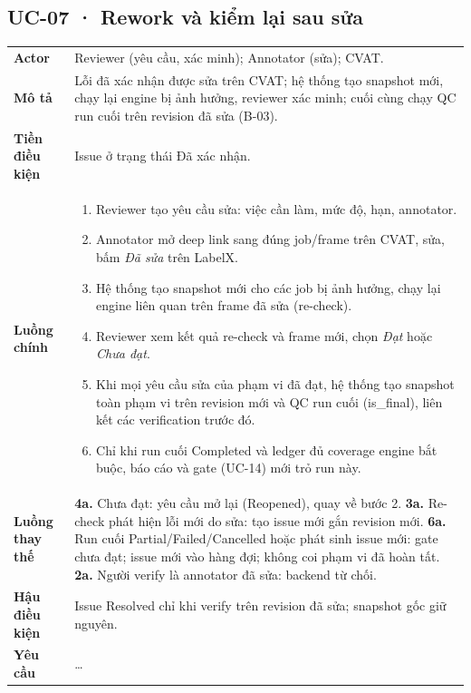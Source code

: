 \subsection*{UC-07 · Rework và kiểm lại sau sửa}
\begin{xltabular}{\linewidth}{@{}>{\bfseries}L{3.2cm}Y@{}}
\toprule
Actor & Reviewer (yêu cầu, xác minh); Annotator (sửa); CVAT.\\
Mô tả & Lỗi đã xác nhận được sửa trên CVAT; hệ thống tạo snapshot mới, chạy lại engine bị ảnh hưởng, reviewer xác minh; cuối cùng chạy QC run cuối trên revision đã sửa (B-03).\\
Tiền điều kiện & Issue ở trạng thái Đã xác nhận.\\
Luồng chính &
\begin{enumerate}[nosep]
  \item Reviewer tạo yêu cầu sửa: việc cần làm, mức độ, hạn, annotator.
  \item Annotator mở deep link sang đúng job/frame trên CVAT, sửa, bấm \emph{Đã sửa} trên LabelX.
  \item Hệ thống tạo snapshot mới cho các job bị ảnh hưởng, chạy lại engine liên quan trên frame đã sửa (re-check).
  \item Reviewer xem kết quả re-check và frame mới, chọn \emph{Đạt} hoặc \emph{Chưa đạt}.
  \item Khi mọi yêu cầu sửa của phạm vi đã đạt, hệ thống tạo snapshot toàn phạm vi trên revision mới và QC run cuối (is\_final), liên kết các verification trước đó.
  \item Chỉ khi run cuối Completed và ledger đủ coverage engine bắt buộc, báo cáo và gate (UC-14) mới trỏ run này.
\end{enumerate}\\
Luồng thay thế & \textbf{4a.} Chưa đạt: yêu cầu mở lại (Reopened), quay về bước 2.\newline
\textbf{3a.} Re-check phát hiện lỗi mới do sửa: tạo issue mới gắn revision mới.\newline
\textbf{6a.} Run cuối Partial/Failed/Cancelled hoặc phát sinh issue mới: gate chưa đạt; issue mới vào hàng đợi; không coi phạm vi đã hoàn tất.\newline
\textbf{2a.} Người verify là annotator đã sửa: backend từ chối.\\
Hậu điều kiện & Issue Resolved chỉ khi verify trên revision đã sửa; snapshot gốc giữ nguyên.\\
Yêu cầu & …\\
\bottomrule
\end{xltabular}

